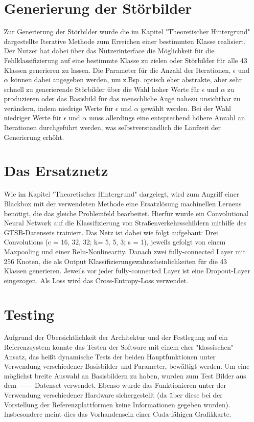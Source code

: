 \section{Generierung der Störbilder}

Zur Generierung der Störbilder wurde die im Kapitel "Theoretischer Hintergrund" dargestellte Iterative Methode zum Erreichen einer bestimmten Klasse realisiert. Der Nutzer hat dabei über das Nutzerinterface die Möglichkeit für die Fehlklassifizierung auf eine bestimmte Klasse zu zielen oder Störbilder für alle 43 Klassen generieren zu lassen. Die Parameter für die Anzahl der Iterationen, \(\epsilon \) und \(\alpha \) können dabei angegeben werden, um z.Bsp. optisch eher abstrakte, aber sehr schnell zu generierende Störbilder über die Wahl hoher Werte für \( \epsilon \) und \( \alpha \) zu produzieren oder das Basisbild für das menschliche Auge nahezu unsichtbar zu verändern, indem niedrige Werte für \(\epsilon \) und \(\alpha \) gewählt werden. Bei der Wahl niedriger Werte für \(\epsilon \) und \(\alpha \) muss allerdings eine entsprechend höhere Anzahl an Iterationen durchgeführt werden, was selbstverständlich die Laufzeit der Generierung erhöht.

\section{Das Ersatznetz}

Wie im Kapitel "Theoretischer Hintergrund" dargelegt, wird zum Angriff einer Blackbox mit der verwendeten Methode eine Ersatzlösung machinellen Lernens benötigt, die das gleiche Problemfeld bearbeitet. Hierfür wurde ein Convolutional Neural Network auf die Klassifizierung von Straßenverkehrsschildern mithilfe des GTSB-Datensets trainiert. Das Netz ist dabei wie folgt aufgebaut:
Drei Convolutions (c = 16, 32, 32; k= 5, 5, 3; s = 1), jeweils gefolgt von einem Maxpooling und einer Relu-Nonlinearity. Danach zwei fully-connected Layer mit 256 Knoten, die als Output Klassifizierungswahrscheinlichkeiten für die 43 Klassen generieren. Jeweils vor jeder fully-connected Layer ist eine Dropout-Layer eingezogen. Als Loss wird das Cross-Entropy-Loss verwendet.

\section{Testing}
 
Aufgrund der Übersichtlichkeit der Architektur und der Festlegung auf ein Referenzsystem konnte das Testen der Software mit einem eher "klassischen" Ansatz, das heißt dynamische Tests der beiden Hauptfunktionen unter Verwendung verschiedener Basisbilder und Parameter, bewältigt werden. Um eine möglichst breite Auswahl an Basisbildern zu haben, wurden zum Test Bilder aus dem ------ Datenset verwendet.
Ebenso wurde das Funktionieren unter der Verwendung verschiedener Hardware sichergestellt (da über diese bei der Vorstellung der Referenzplattformen keine Informationen gegeben wurden). Insbesondere meint dies das Vorhandensein einer Cuda-fähigen Grafikkarte.

